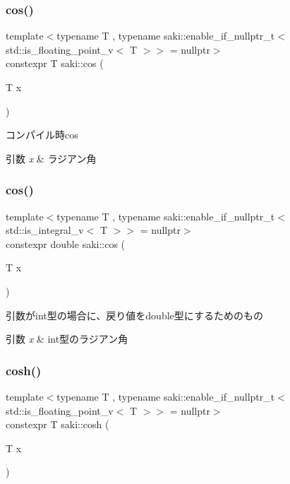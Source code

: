 \subsubsection{\texorpdfstring{cos()}{cos()}\hspace{0.1cm}{\footnotesize\ttfamily [1/2]}}
{\footnotesize\ttfamily template$<$typename T , typename saki\+::enable\+\_\+if\+\_\+nullptr\+\_\+t$<$ std\+::is\+\_\+floating\+\_\+point\+\_\+v$<$ T $>$$>$  = nullptr$>$ \\
constexpr T saki\+::cos (\begin{DoxyParamCaption}\item[{T}]{x }\end{DoxyParamCaption})}



コンパイル時cos 


\begin{DoxyParams}{引数}
{\em x} & ラジアン角 \\
\hline
\end{DoxyParams}
\mbox{\label{namespacesaki_ab1f49aa2d1182883ae8b4c01b346cc88}} 
\subsubsection{\texorpdfstring{cos()}{cos()}\hspace{0.1cm}{\footnotesize\ttfamily [2/2]}}
{\footnotesize\ttfamily template$<$typename T , typename saki\+::enable\+\_\+if\+\_\+nullptr\+\_\+t$<$ std\+::is\+\_\+integral\+\_\+v$<$ T $>$$>$  = nullptr$>$ \\
constexpr double saki\+::cos (\begin{DoxyParamCaption}\item[{T}]{x }\end{DoxyParamCaption})}



引数がint型の場合に、戻り値をdouble型にするためのもの 


\begin{DoxyParams}{引数}
{\em x} & int型のラジアン角 \\
\hline
\end{DoxyParams}
\mbox{\label{namespacesaki_a0f8167af6da5c9eb510d33dadae13708}} 
\subsubsection{\texorpdfstring{cosh()}{cosh()}\hspace{0.1cm}{\footnotesize\ttfamily [1/2]}}
{\footnotesize\ttfamily template$<$typename T , typename saki\+::enable\+\_\+if\+\_\+nullptr\+\_\+t$<$ std\+::is\+\_\+floating\+\_\+point\+\_\+v$<$ T $>$$>$  = nullptr$>$ \\
constexpr T saki\+::cosh (\begin{DoxyParamCaption}\item[{T}]{x }\end{DoxyParamCaption})}



